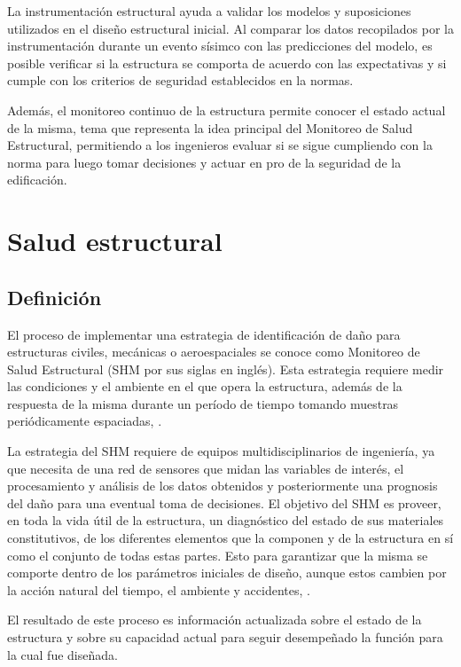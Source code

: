 La instrumentación estructural ayuda a validar los modelos y suposiciones utilizados en el diseño estructural inicial. Al comparar los datos recopilados por la instrumentación durante un evento sísimco con las predicciones del modelo, es posible verificar si la estructura se comporta de acuerdo con las expectativas y si cumple con los criterios de seguridad establecidos en la normas.

Además, el monitoreo continuo de la estructura permite conocer el estado actual de la misma, tema que representa la idea principal del Monitoreo de Salud Estructural, permitiendo a los ingenieros evaluar si se sigue cumpliendo con la norma para luego tomar decisiones y actuar en pro de la seguridad de la edificación.


\section{Salud estructural}

\subsection{Definición}


El proceso de implementar una estrategia de identificación de daño para estructuras civiles, mecánicas o aeroespaciales se conoce como Monitoreo de Salud Estructural (SHM por sus siglas en inglés). Esta estrategia requiere medir las condiciones y el ambiente en el que opera la estructura, además de la respuesta de la misma durante un período de tiempo tomando muestras periódicamente espaciadas, \citep{farrar2007introduction}.


La estrategia del SHM requiere de equipos multidisciplinarios de ingeniería, ya que necesita de una red de sensores que midan las variables de interés, el procesamiento y análisis de los datos obtenidos y posteriormente una prognosis del daño para una eventual toma de decisiones. El objetivo del SHM es proveer, en toda la vida útil de la estructura, un diagnóstico del estado de sus materiales constitutivos, de los diferentes elementos que la componen y de la estructura en sí como el conjunto de todas estas partes. Esto para garantizar que la misma se comporte dentro de los parámetros iniciales de diseño, aunque estos cambien por la acción natural del tiempo, el ambiente y accidentes, \citep{balageas2010structural}.

El resultado de este proceso es información actualizada sobre el estado de la estructura y sobre su capacidad actual para seguir desempeñado la función para la cual fue diseñada.


